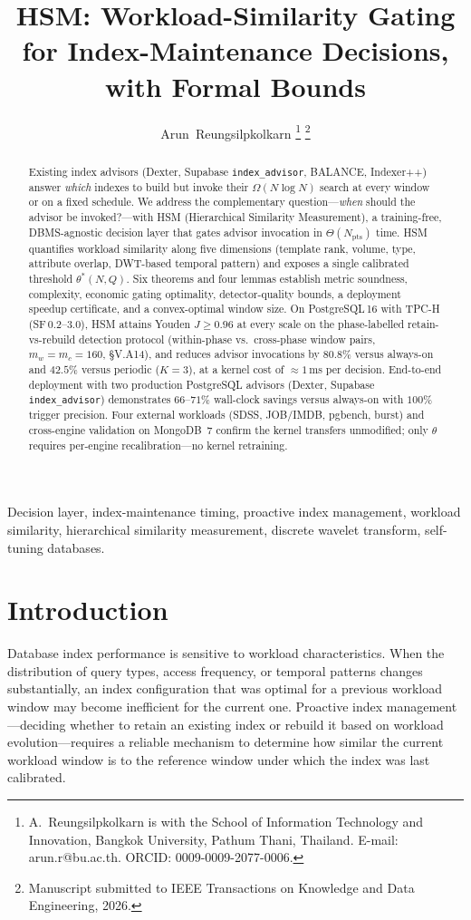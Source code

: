 \documentclass[10pt,journal,compsoc]{IEEEtran}
\title{HSM: Workload-Similarity Gating for Index-Maintenance Decisions, with Formal Bounds}
\author{Arun~Reungsilpkolkarn%
\thanks{A.~Reungsilpkolkarn is with the School of Information Technology and Innovation, Bangkok University, Pathum Thani, Thailand. E-mail: arun.r@bu.ac.th. ORCID: 0009-0009-2077-0006.}%
\thanks{Manuscript submitted to IEEE Transactions on Knowledge and Data Engineering, 2026.}}
\newcommand{\Npts}{N_{\mathrm{pts}}}
\newcommand{\thetastar}{\theta^{*}}
\begin{document}
\maketitle

\begin{abstract}
Existing index advisors (Dexter, Supabase
\texttt{index\_advisor}, BALANCE, Indexer++) answer \emph{which}
indexes to build but invoke their $\Omega(N\log N)$ search at
every window or on a fixed schedule.  We address the complementary
question---\emph{when} should the advisor be invoked?---with HSM
(Hierarchical Similarity Measurement), a training-free,
DBMS-agnostic decision layer that gates advisor invocation in
$\Theta(\Npts)$ time.  HSM quantifies workload similarity along
five dimensions (template rank, volume, type, attribute overlap,
DWT-based temporal pattern) and exposes a single calibrated
threshold $\thetastar(N,Q)$.  Six theorems and four lemmas
establish metric soundness, complexity, economic gating
optimality, detector-quality bounds, a deployment speedup
certificate, and a convex-optimal window size.
On PostgreSQL\,16 with TPC-H (SF\,0.2--3.0), HSM attains
Youden $J\!\ge\!0.96$ at every scale on the phase-labelled
retain-vs-rebuild detection protocol (within-phase vs.\ cross-phase
window pairs, $m_w\!=\!m_c\!=\!160$, \S V.A14), and reduces advisor
invocations by $80.8\%$ versus always-on and $42.5\%$ versus periodic
($K\!=\!3$), at a kernel cost of $\approx\!1$\,ms per decision.
End-to-end deployment with two production PostgreSQL advisors
(Dexter, Supabase \texttt{index\_advisor}) demonstrates $66$--$71\%$
wall-clock savings versus always-on with $100\%$ trigger precision.
Four external workloads (SDSS, JOB/IMDB, pgbench, burst) and
cross-engine validation on MongoDB~7 confirm the kernel transfers
unmodified; only $\theta$ requires per-engine recalibration---no
kernel retraining.
\end{abstract}

\begin{IEEEkeywords}
Decision layer, index-maintenance timing, proactive index management, workload similarity, hierarchical similarity measurement, discrete wavelet transform, self-tuning databases.
\end{IEEEkeywords}

\section{Introduction}

Database index performance is sensitive to workload characteristics. When
the distribution of query types, access frequency, or temporal patterns
changes substantially, an index configuration that was optimal for a
previous workload window may become inefficient for the current one.
Proactive index management---deciding whether to retain an existing index
or rebuild it based on workload evolution---requires a reliable mechanism
to determine how similar the current workload window is to the reference
window under which the index was last calibrated.
\end{document}

